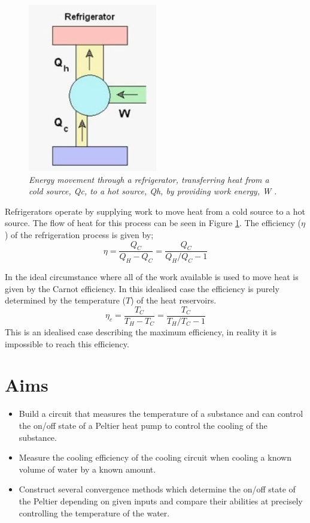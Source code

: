 \documentclass[10pt]{article}
\begin{document}
\begin{figure}[h!]
    \centering
    \includegraphics[scale=.75]{ref.jpg}
    \caption{\it{Energy movement through a refrigerator, transferring heat from a cold source, Qc, to a hot source, Qh, by providing work energy, W \cite{fridge}.}}
    \label{fig:fridge}
\end{figure}

Refrigerators operate by supplying work to move heat from a cold source to a hot source. The flow of heat for this process can be seen in Figure \ref{fig:fridge}. The efficiency ($\eta$) of the refrigeration process is given by;
\begin{equation}\label{eq:eff}
    \eta = \frac{Q_C}{Q_H-Q_C}=\frac{Q_C}{Q_H/Q_C - 1}
\end{equation}

In the ideal circumstance where all of the work available is used to move heat is given by the Carnot efficiency\cite{carnot}. In this idealised case the efficiency is purely determined by the temperature ($T$) of the heat reservoirs.
\begin{equation}\label{eq:carn_eff}
        \eta_c = \frac{T_C}{T_H-T_C}=\frac{T_C}{T_H/T_C - 1}
\end{equation}
This is an idealised case describing the maximum efficiency, in reality it is impossible to reach this efficiency. 




\section*{Aims}
\begin{itemize}
    \item Build a circuit that measures the temperature of a substance and can control the on/off state of a Peltier heat pump\cite{peltier} to control the cooling of the substance. 
    \item Measure the cooling efficiency of the cooling circuit when cooling a known volume of water by a known amount.
    \item Construct several convergence methods which determine the on/off state of the Peltier depending on given inputs and compare their abilities at precisely controlling the temperature of the water.
\end{itemize}
\end{document}
